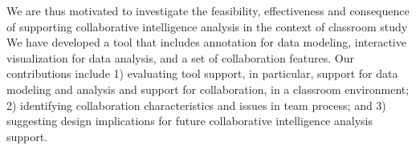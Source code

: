 We are thus
motivated to investigate the feasibility, effectiveness and consequence of
supporting collaborative intelligence analysis in the context of classroom study
We have developed a tool that
includes annotation for data modeling, interactive visualization for data
analysis, and a set of collaboration features. Our contributions include 1) evaluating
tool support, in particular, support for data modeling and analysis and support
for collaboration, in a classroom environment; 2) identifying collaboration
characteristics and issues in team process; and 3) suggesting design
implications for future collaborative intelligence analysis support.

